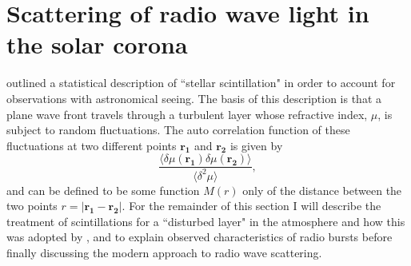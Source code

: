 \section{Scattering of radio wave light in the solar corona}
\label{sec:scattering_theory}

\cite{Chandrasekhar1952} outlined a statistical description of ``stellar scintillation" in order to account for observations with astronomical seeing.  The basis of this description is that a plane wave front travels through a turbulent layer whose refractive index, $\mu$, is subject to random fluctuations. The auto correlation function of these fluctuations at two different points $\mathbf{r_1}$ and $\mathbf{r_2}$ is given by
$$
\frac{\langle \delta \mu(\mathbf{r_1}) \delta \mu(\mathbf{r_2}) \rangle}{\langle \delta^2 \mu \rangle}, 
$$
and can be defined to be some function $M(r)$ only of the distance between the two points $r = \vert \mathbf{r_1} - \mathbf{r_2} \vert$. For the remainder of this section I will describe the \cite{Chandrasekhar1952} treatment of scintillations for a ``disturbed layer" in the atmosphere and how this was adopted by \cite{Fokker1965}, \cite{Steinberg1971} and \cite{Riddle1974} to explain observed characteristics of radio bursts before finally discussing the modern approach to radio wave scattering.

